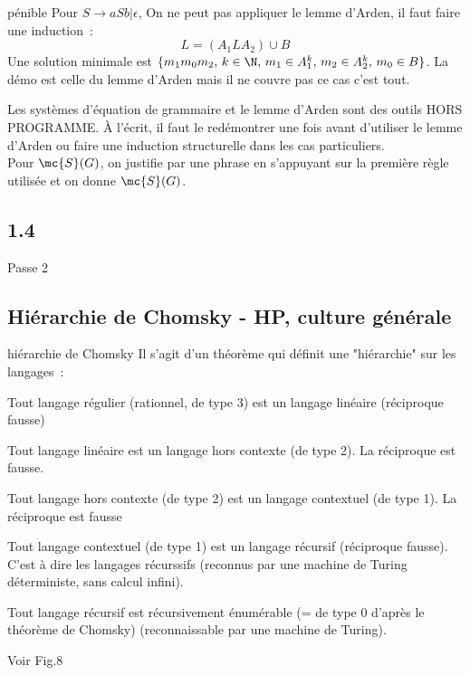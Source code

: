 \begin{adjustwidth}{-3cm}{-3cm}
\begin{exemple}{}{pénible}
    Pour $S\rightarrow aSb \vert \epsilon$,
    On ne peut pas appliquer le lemme d'Arden, il faut faire une induction~:
    $$L = (A_1LA_2) \cup B$$
    Une solution minimale est $\{m_1 m_0 m_2,\, k \in \N,\, m_1 \in A_1^k,\, m_2 \in A_2^k,\, m_0 \in B\}$. La démo est celle du lemme d'Arden mais il ne couvre pas ce cas c'est tout.
\end{exemple}

\begin{remarque}{}{}
    Les systèmes d'équation de grammaire et le lemme d'Arden sont des outils HORS PROGRAMME. À l'écrit, il faut le redémontrer une fois avant d'utiliser le lemme d'Arden ou faire une induction structurelle dans les cas particuliers.\\
    Pour $\mc{S}(G)$, on justifie par une phrase en s'appuyant sur la première règle utilisée et on donne $\mc{S}(G)$.
\end{remarque}

\subsection{1.4}

Passe 2

\subsection{Hiérarchie de Chomsky - HP, culture générale}

\begin{theoreme}{}{hiérarchie de Chomsky}
    Il s'agit d'un théorème qui définit une "hiérarchie" sur les langages~:
    \begin{enumeratebf}
        \item Tout langage régulier (rationnel, de type 3) est un langage linéaire (réciproque fausse)
        \item Tout langage linéaire est un langage hors contexte (de type 2). La réciproque est fausse.
        \item Tout langage hors contexte (de type 2) est un langage contextuel (de type 1). La réciproque est fausse
        \item Tout langage contextuel (de type 1) est un langage récursif (réciproque fausse). C'est à dire les langages récurssifs (\ie reconnus par une machine de Turing déterministe, sans calcul infini).
        \item Tout langage récursif est récursivement énumérable (= de type 0 d'après le théorème de Chomsky) (reconnaissable par une machine de Turing).
    \end{enumeratebf}
    Voir Fig.8
\end{theoreme}


\end{adjustwidth}
